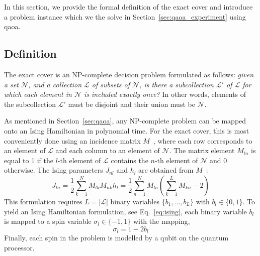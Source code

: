 In this section, we provide the formal definition of the exact cover and introduce a problem instance which we the solve in Section~\ref{sec:qaoa_experiment} using \gls{qaoa}. 

\subsection{Definition}
The exact cover is an NP-complete decision problem formulated as follows: \textit{given a set $\mathcal{N}$, and a collection $\mathcal{L}$ of subsets of $\mathcal{N}$, is there a subcollection $\mathcal{L}'$ of $\mathcal{L}$ for which each element in $\mathcal{N}$ is included exactly once?} In other words, elements of the subcollection $\mathcal{L}'$ must be disjoint and their union must be $\mathcal{N}$.

As mentioned in Section~\ref{sec:qaoa}, any NP-complete problem can be mapped onto an Ising Hamiltonian in polynomial time. For the exact cover, this is most conveniently done using an incidence matrix $M$~\cite{WeissteinIncidenceMatrix}, where each row corresponds to an element of $\mathcal{L}$ and each column to an element of $\mathcal{N}$. The matrix element $M_{ln}$ is equal to 1 if the $l$-th element of $\mathcal{L}$ contains the $n$-th element of $\mathcal{N}$ and 0 otherwise.
The Ising parameters $J_{nl}$ and $h_l$ are obtained from $M$~\cite{Lucas2014IsingProblems, Vikstal2019ApplyingProblem}:
\begin{subequations}
\begin{equation}
    J_{l n}=\frac{1}{2} \sum_{k=1}^{N} M_{l k} M_{n k}
\end{equation}
\begin{equation}
h_{l}=\frac{1}{2} \sum_{n=1}^{N} M_{l n}\left(\sum_{k=1}^{L} M_{k n}-2\right)
\end{equation}
\end{subequations}
This formulation requires $L = |\mathcal{L}|$ binary variables $\{b_1, ..., b_L\}$ with $b_l\in\{0,1\}$. To yield an Ising Hamiltonian formulation, see Eq.~\eqref{eq:ising}, each binary variable $b_l$ is mapped to a spin variable $\sigma_l \in \{-1,1\}$ with the mapping, 
\begin{equation}
\sigma_l = 1 - 2 b_l
\end{equation}
Finally, each spin in the problem is modelled by a qubit on the quantum processor. 


